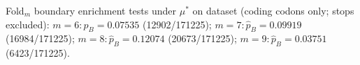 Fold$_m$ boundary enrichment tests under $\mu^\ast$ on dataset  (coding codons only; stops excluded): $m=6: \widehat{p}_B=0.07535$ (12902/171225); $m=7: \widehat{p}_B=0.09919$ (16984/171225); $m=8: \widehat{p}_B=0.12074$ (20673/171225); $m=9: \widehat{p}_B=0.03751$ (6423/171225).
